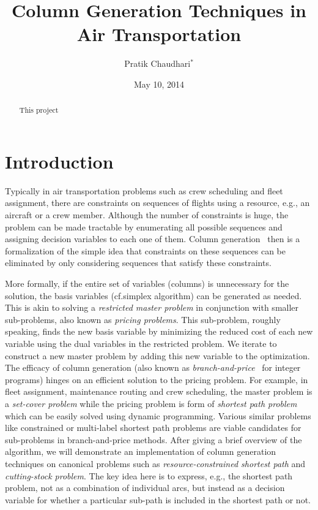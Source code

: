 \documentclass[letterpaper, 10pt, twocolumn, reqno]{amsart}
\title{Column Generation Techniques in Air Transportation}
\author{Pratik Chaudhari$^*$}
\date{May 10, 2014}
\begin{document}
\begin{abstract}
This project
\end{abstract}
\maketitle

\section{Introduction}
\label{sec:intro}

Typically in air transportation problems such as crew scheduling and fleet assignment, there are constraints on sequences of flights using a resource, e.g., an aircraft or a crew member. Although the number of constraints is huge, the problem can be made tractable by enumerating all possible sequences and assigning decision variables to each one of them. Column generation~\cite{desrosiers2005primer} then is a formalization of the simple idea that constraints on these sequences can be eliminated by only considering sequences that satisfy these constraints.

More formally, if the entire set of variables (columns) is unnecessary for the solution, the basis variables (cf.\@ simplex algorithm) can be generated as needed. This is akin to solving a \emph{restricted master problem} in conjunction with smaller sub-problems, also known as \emph{pricing problems}. This sub-problem, roughly speaking, finds the new basis variable by minimizing the reduced cost of each new variable using the dual variables in the restricted problem. We iterate to construct a new master problem by adding this new variable to the optimization. The efficacy of column generation (also known as \emph{branch-and-price}~\cite{barnhart1998branch} for integer programs) hinges on an efficient solution to the pricing problem. For example, in fleet assignment, maintenance routing and crew scheduling, the master problem is a \emph{set-cover problem} while the pricing problem is form of \emph{shortest path problem} which can be easily solved using dynamic programming. Various similar problems like constrained or multi-label shortest path problems are viable candidates for sub-problems in branch-and-price methods. After giving a brief overview of the algorithm, we will demonstrate an implementation of column generation techniques on canonical problems such as \emph{resource-constrained shortest path} and \emph{cutting-stock problem}. The key idea here is to express, e.g., the shortest path problem, not as a combination of individual arcs, but instead as a decision variable for whether a particular sub-path is included in the shortest path or not.
\end{document}
